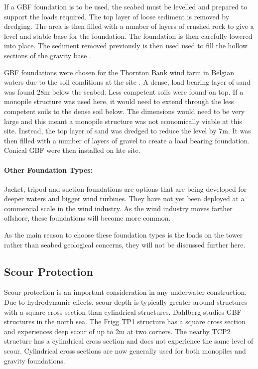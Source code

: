 \documentclass[12pt]{article} %
\begin{document}
If a GBF foundation is to be used, the seabed must be levelled and prepared to support the loads required. The top layer of loose sediment is removed by dredging. The area is then filled with a number of layers of crushed rock to give a level and stable base for the foundation. The foundation is then carefully lowered into place. The sediment removed previously is then used used to fill the hollow sections of the gravity base \cite{ruiz}. 

GBF foundations were chosen for the Thornton Bank wind farm in Belgian waters due to the soil conditions at the site \cite{thornton}. A dense, load bearing layer of sand was found 28m below the seabed. Less competent soils were found on top. If a monopile structure was used here, it would need to extend through the less competent soils to the dense soil below. The dimensions would need to be very large and this meant a monopile structure was not economically viable at this site. Instead, the top layer of sand was dredged to reduce the level by 7m. It was then filled with a number of layers of gravel to create a load bearing foundation. Conical GBF were then installed on hte site.

\paragraph{Other Foundation Types:} Jacket, tripod and suction foundations are options that are being developed for deeper waters and bigger wind turbines. They have not yet been deployed at a commercial scale in the wind industry. As the wind industry moves farther offshore, these foundations will become more common. 

As the main reason to choose these foundation types is the loads on the tower rather than seabed geological concerns, they will not be discussed further here.

\subsection{Scour Protection}
Scour protection is an important consideration in any underwater construction.
Due to hydrodynamic effects, scour depth is typically greater around structures with a square cross section than cylindrical structures. Dahlberg \cite{dahlberg} studies GBF structures in the north sea. The Frigg TP1 structure has a square cross section and experiences deep scour of up to 2m at two corners. The nearby TCP2 structure has a cylindrical cross section and does not experience the same level of scour.
Cylindrical cross sections are now generally used for both monopiles and gravity foundations.
\end{document}

